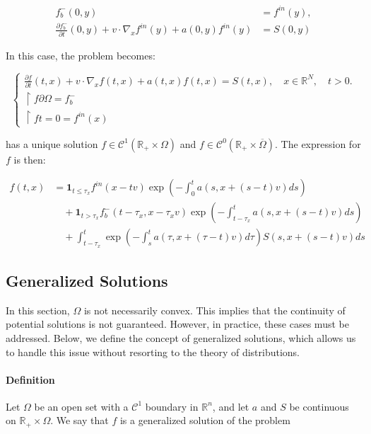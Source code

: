 \documentclass[onecolumn, 12pt, a4paper]{article}
\begin{document}
	\[
	\begin{aligned}
		f_b^-(0,y) &= f^{in}(y), \\
		\frac{\partial f_b^-}{\partial t}(0,y) + v \cdot \nabla_x f^{in}(y) + a(0,y)f^{in}(y)&=S(0,y)
	\end{aligned}
	\]
	
	
	
	In this case, the problem becomes:
	
	\[
	\begin{cases}
		\frac{\partial f}{\partial t}(t,x)+v \cdot \nabla_x f(t,x)+ a(t,x)f(t,x)=S(t,x), \quad x \in \mathbb{R}^N, \quad t>0.\\
		\restriction{f}{\partial \Omega}= f_b^-\\
		\restriction{f}{t=0}= f^{in}(x)
	\end{cases}
	\]
	
	has a unique solution $f \in \mathcal{C}^1(\mathbb{R}_+ \times \Omega)$ and $f \in \mathcal{C}^0(\mathbb{R}_+ \times \overline{\Omega})$. The expression for $f$ is then:
	
	
	\[
	\boxed{
		\begin{aligned}
			f(t,x) &= \mathbf{1}_{t \leq \tau_x} f^{in} (x-tv) \exp\left(-\int_0^t a(s,x+(s-t)v)ds\right) \\
			&\quad + \mathbf{1}_{t > \tau_x} f_b^- (t-\tau_x,x-\tau_x v) \exp\left(-\int_{t-\tau_x}^t a(s,x+(s-t)v)ds\right) \\
			&\quad + \int_{t-\tau_x}^t \exp\left(-\int_{s}^{t}a(\tau,x+(\tau-t)v)d\tau\right) S(s,x+(s-t)v)ds
	\end{aligned}}
	\]
	
	
	\subsection{Generalized Solutions}
	
	In this section, $\Omega$ is not necessarily convex. This implies that the continuity of potential solutions is not guaranteed. However, in practice, these cases must be addressed. Below, we define the concept of generalized solutions, which allows us to handle this issue without resorting to the theory of distributions.
	
	
	\paragraph{Definition}
	
	Let $\Omega$ be an open set with a $\mathcal{C}^1$ boundary in $\mathbb{R}^n$, and let $a$ and $S$ be continuous on $\mathbb{R}_+ \times \Omega$. We say that $f$ is a generalized solution of the problem
	
\end{document}
